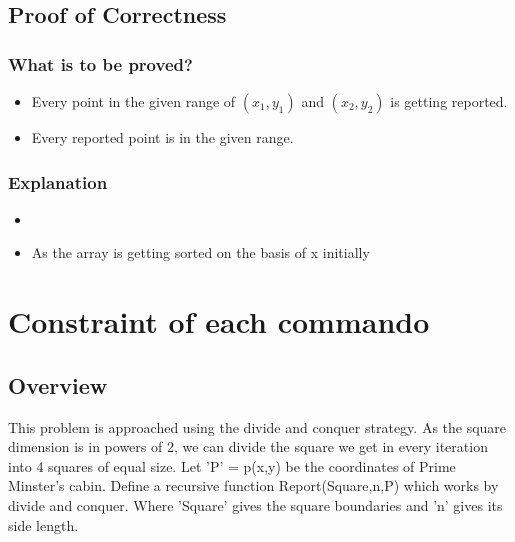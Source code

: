 \documentclass{article}
\begin{document}
\subsection{Proof of Correctness}
\subsubsection{What is to be proved?}
\begin{itemize}
\item Every point in the given range of $(x_1,y_1)$ and $(x_2,y_2)$ is getting reported.
\item Every reported point is in the given range.
\end{itemize}
\subsubsection{Explanation}
\begin{itemize}
\item 
\item As the array is getting sorted on the basis of x initially
\end{itemize}
\newpage
\section{Constraint of each commando}
\subsection{Overview}
This problem is approached using the divide and conquer strategy. As the square dimension is in powers of 2, we can divide the square we get in every iteration into 4 squares of equal size. Let 'P' = p(x,y) be the coordinates of Prime Minster's cabin. Define a recursive function Report(Square,n,P) which works by divide and conquer. Where 'Square' gives the square boundaries and 'n' gives its side length. 
\end{document}

